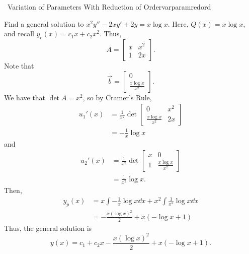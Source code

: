         \begin{example}{\Difficulty\,\Difficulty\,\,Variation of Parameters With Reduction of Order}{varparamredord}

            Find a general solution to \(x^2y''-2xy'+2y=x\log x\). Here, \(Q(x)=x\log x\), and recall \(y_c(x)=c_1x+c_2x^2\). Thus,
            \begin{equation*}
                A=\begin{bmatrix}
                    x & x^2 \\
                    1 & 2x
                \end{bmatrix}.
            \end{equation*}
            Note that
            \begin{equation*}
                \vec{b}=\begin{bmatrix} 0 \\ \frac{x\log x}{x^2} \end{bmatrix}.
            \end{equation*}
            We have that \(\det A=x^2\), so by Cramer's Rule,
            \begin{align*}
                u_1'(x)&=\frac{1}{x^2}\det\begin{bmatrix} 0 & x^2 \\ \frac{x\log x}{x^2} & 2x \end{bmatrix} \\
                &=-\frac{1}{x}\log x
            \end{align*}
            and
            \begin{align*}
                u_2'(x)&=\frac{1}{x^2}\det\begin{bmatrix} x & 0 \\ 1 & \frac{x\log x}{x^2} \end{bmatrix} \\
                &=\frac{1}{x^2}\log x.
            \end{align*}
            Then,
            \begin{align*}
                y_p(x)&=x\int -\frac{1}{x}\log x \dd x+x^2\int \frac{1}{x^2}\log x\dd x \\
                &=-\frac{x(\log x)^2}{2}+x(-\log x+1)
            \end{align*}
            Thus, the general solution is
            \begin{equation*}
                y(x)=c_1+c_2x-\frac{x(\log x)^2}{2}+x(-\log x+1).
            \end{equation*}
            
        \end{example}

